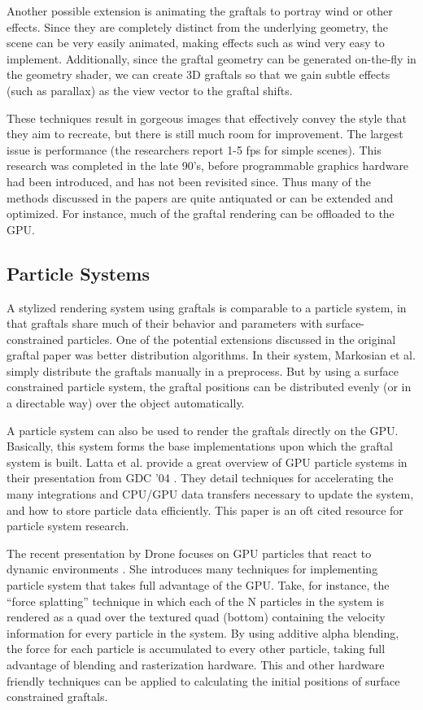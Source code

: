 \documentclass[notitlepage]{report}
\begin{document}
Another possible extension is animating the graftals to portray wind or other effects. Since they are completely distinct from the underlying geometry, the scene can be very easily animated, making effects such as wind very easy to implement. Additionally, since the graftal geometry can be generated on-the-fly in the geometry shader, we can create 3D graftals so that we gain subtle effects (such as parallax) as the view vector to the graftal shifts.

These techniques result in gorgeous images that effectively convey the style that they aim to recreate, but there is still much room for improvement. The largest issue is performance (the researchers report 1-5 fps for simple scenes). This research was completed in the late 90's, before programmable graphics hardware had been introduced, and has not been revisited since. Thus many of the methods discussed in the papers are quite antiquated or can be extended and optimized. For instance, much of the graftal rendering can be offloaded to the GPU. 


\subsection{Particle Systems}

A stylized rendering system using graftals is comparable to a particle system, in that graftals share much of their behavior and parameters with surface-constrained particles. One of the potential extensions discussed in the original graftal paper \cite{Markosian2000} was better distribution algorithms. In their system, Markosian et al. simply distribute the graftals manually in a preprocess. But by using a surface constrained particle system, the graftal positions can be distributed evenly (or in a directable way) over the object automatically. 

A particle system can also be used to render the graftals directly on the GPU. Basically, this system forms the base implementations upon which the graftal system is built. Latta et al. provide a great overview of GPU particle systems in their presentation from GDC ’04 \cite{Latta2004}. They detail techniques for accelerating the many integrations and CPU/GPU data transfers necessary to update the system, and how to store particle data efficiently. This paper is an oft cited resource for particle system research.

The recent presentation by Drone focuses on GPU particles that react to dynamic environments \cite{Drone2007}. She introduces many techniques for implementing particle system that takes full advantage of the GPU. Take, for instance, the “force splatting” technique in which each of the N particles in the system is rendered as a quad over the textured quad (bottom) containing the velocity information for every particle in the system. By using additive alpha blending, the force for each particle is accumulated to every other particle, taking full advantage of blending and rasterization hardware. This and other hardware friendly techniques can be applied to calculating the initial positions of surface constrained graftals.
\end{document}
